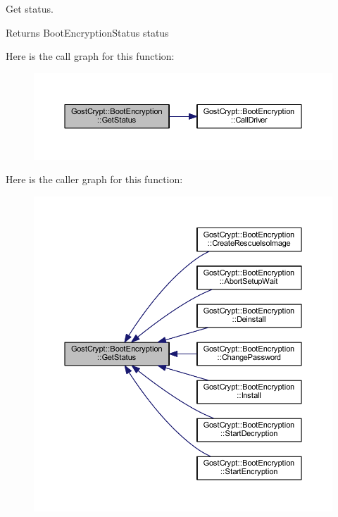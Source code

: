 Get status. 

\begin{DoxyReturn}{Returns}
Boot\+Encryption\+Status status 
\end{DoxyReturn}
Here is the call graph for this function\+:
\nopagebreak
\begin{figure}[H]
\begin{center}
\leavevmode
\includegraphics[width=350pt]{class_gost_crypt_1_1_boot_encryption_a55499453ff60a4484743a7f286702cba_cgraph}
\end{center}
\end{figure}
Here is the caller graph for this function\+:
\nopagebreak
\begin{figure}[H]
\begin{center}
\leavevmode
\includegraphics[width=350pt]{class_gost_crypt_1_1_boot_encryption_a55499453ff60a4484743a7f286702cba_icgraph}
\end{center}
\end{figure}
\mbox{\label{class_gost_crypt_1_1_boot_encryption_ab325c58a9939344bdfe056d20df0f5ff}} 
